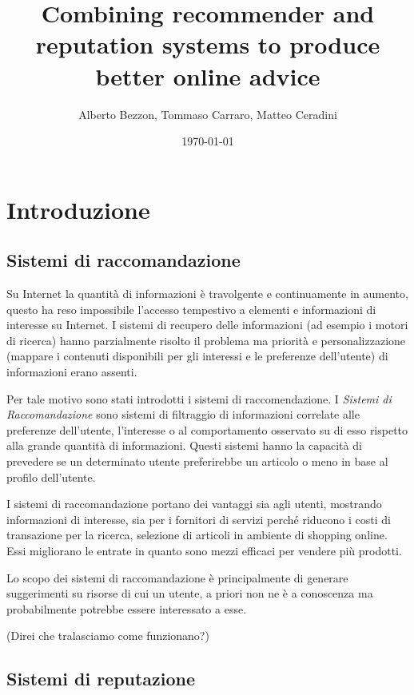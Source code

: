\documentclass{report}
\author{Alberto Bezzon, Tommaso Carraro, Matteo Ceradini} \title{Combining recommender and reputation systems to produce better online advice} \date{\today}
\begin{document}
	\maketitle
	\tableofcontents
	\newpage
	\hypertarget{header-n0}{%
		\section{Introduzione}\label{header-n0}}
	
	\hypertarget{header-n2}{%
		\subsection{Sistemi di raccomandazione}\label{header-n2}}
	
	Su Internet la quantità di informazioni è travolgente e continuamente in
	aumento, questo ha reso impossibile l'accesso tempestivo a elementi e
	informazioni di interesse su Internet. I sistemi di recupero delle
	informazioni (ad esempio i motori di ricerca) hanno parzialmente risolto
	il problema ma priorità e personalizzazione (mappare i contenuti
	disponibili per gli interessi e le preferenze dell'utente) di
	informazioni erano assenti.
	
	Per tale motivo sono stati introdotti i sistemi di raccomendazione. I
	\emph{Sistemi di Raccomandazione} sono sistemi di filtraggio di
	informazioni correlate alle preferenze dell'utente, l'interesse o al
	comportamento osservato su di esso rispetto alla grande quantità di
	informazioni. Questi sistemi hanno la capacità di prevedere se un
	determinato utente preferirebbe un articolo o meno in base al profilo
	dell'utente.
	
	I sistemi di raccomandazione portano dei vantaggi sia agli utenti,
	mostrando informazioni di interesse, sia per i fornitori di servizi
	perché riducono i costi di transazione per la ricerca, selezione di
	articoli in ambiente di shopping online. Essi migliorano le entrate in
	quanto sono mezzi efficaci per vendere più prodotti.
	
	Lo scopo dei sistemi di raccomandazione è principalmente di generare
	suggerimenti su risorse di cui un utente, a priori non ne è a conoscenza
	ma probabilmente potrebbe essere interessato a esse.
	
	(Direi che tralasciamo come funzionano?)
	
	\hypertarget{header-n15}{%
		\subsection{Sistemi di reputazione}\label{header-n15}}
	
\end{document}
